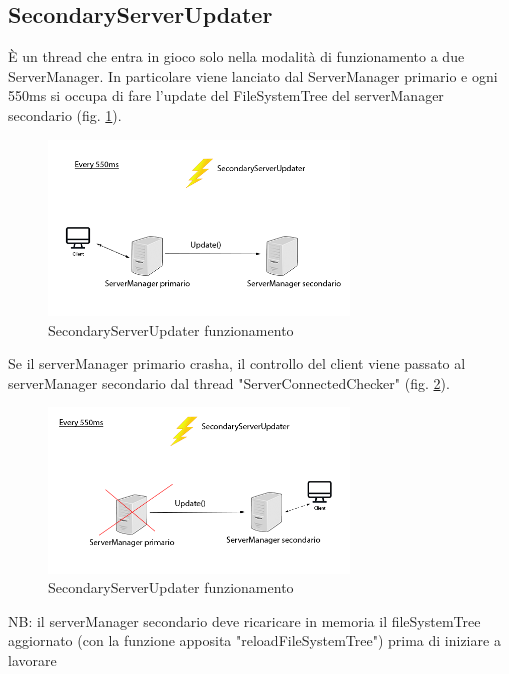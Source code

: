\documentclass[]{article}
\begin{document}
\subsection{SecondaryServerUpdater}

È un thread che entra in gioco solo nella modalità di funzionamento a due ServerManager. In particolare viene lanciato dal ServerManager primario e ogni 550ms si occupa di fare l'update del FileSystemTree del serverManager secondario (fig. \ref{fig:SecondaryServerUpdater}).


\begin{figure}[h]
	\centering
	\includegraphics[width=8cm]{../Img/SecondaryServerUpdater.png}
	\caption[]{SecondaryServerUpdater funzionamento}
	\label{fig:SecondaryServerUpdater}
	
\end{figure}

Se il serverManager primario crasha, il controllo del client viene passato al serverManager secondario dal thread "ServerConnectedChecker" (fig. \ref{fig:SecondaryServerUpdater2}).



\begin{figure}
	\centering
	\includegraphics[width=8cm]{../Img/SecondaryServerUpdater2.png}
	\caption[]{SecondaryServerUpdater funzionamento}
	\label{fig:SecondaryServerUpdater2}
	
\end{figure}

\vspace{0.5cm}
NB: il serverManager secondario deve ricaricare in memoria il fileSystemTree aggiornato (con la funzione apposita "reloadFileSystemTree") prima di iniziare a lavorare
\end{document}
